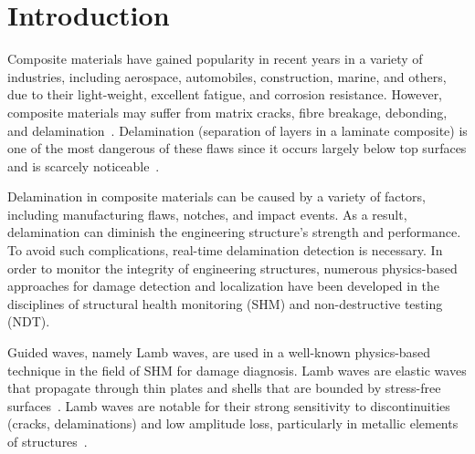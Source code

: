 \section{Introduction}
Composite materials have gained popularity in recent years in a variety of industries, including aerospace, automobiles, construction, marine, and others, due to their light-weight, excellent fatigue, and corrosion resistance.
However, composite materials may suffer from matrix cracks, fibre breakage, debonding, and delamination~\cite{ip2004delamination, smith2009composite}.
Delamination (separation of layers in a laminate composite) is one of the most dangerous of these flaws since it occurs largely below top surfaces and is scarcely noticeable~\cite{Cai2012a}.

Delamination in composite materials can be caused by a variety of factors, including manufacturing flaws, notches, and impact events.
As a result, delamination can diminish the engineering structure's strength and performance.
To avoid such complications, real-time delamination detection is necessary.
In order to monitor the integrity of engineering structures, numerous physics-based approaches for damage detection and localization have been developed in the disciplines of structural health monitoring (SHM) and non-destructive testing (NDT).

Guided waves, namely Lamb waves, are used in a well-known physics-based technique in the field of SHM for damage diagnosis.
Lamb waves are elastic waves that propagate through thin plates and shells that are bounded by stress-free surfaces~\cite{mitra2016guided}.
Lamb waves are notable for their strong sensitivity to discontinuities (cracks, delaminations) and low amplitude loss, particularly in metallic elements of structures~\cite{Keulen2014}.

